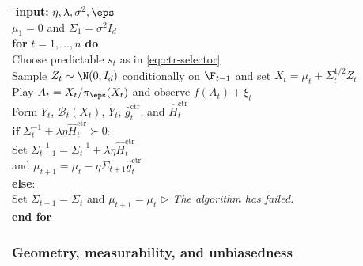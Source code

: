\begin{algorithm}[!t]
    \caption{Tangent-centred unprojected Hermite--ONS}
    \label{alg:ctr-unprojected}
    \small
    \begin{tabbing}
        \qquad\=\qquad\=\kill
        \textbf{input:} $\eta,\lambda,\sigma^2,\eps$\\
        $\mu_1=0$ and $\Sigma_1=\sigma^2I_d$\\[1mm]
        \textbf{for} $t=1,\ldots,n$ \textbf{do}\\
        \>Choose predictable $s_t$ as in \eqref{eq:ctr-selector}\\
        \>Sample $Z_t\sim\N(0,I_d)$ conditionally on $\F_{t-1}$ and set
        $X_t=\mu_t+\Sigma_t^{1/2}Z_t$\\
        \>Play $A_t=X_t/\pi_\eps(X_t)$ and observe $f(A_t)+\xi_t$\\
        \>Form $Y_t$, $\mathcal B_t(X_t)$, $\widetilde Y_t$,
        $\widehat g_t^{\mathrm{ctr}}$, and $\widehat H_t^{\mathrm{ctr}}$\\
        \>\textbf{if}
        $\Sigma_t^{-1}+\lambda\eta\widehat H_t^{\mathrm{ctr}}\succ0$:\\
        \>\>Set
        $\Sigma_{t+1}^{-1}
            =\Sigma_t^{-1}+\lambda\eta\widehat H_t^{\mathrm{ctr}}$\\
        \>\>and
        $\mu_{t+1}=\mu_t-\eta\Sigma_{t+1}
            \widehat g_t^{\mathrm{ctr}}$\\
        \>\textbf{else}:\\
        \>\>Set $\Sigma_{t+1}=\Sigma_t$ and $\mu_{t+1}=\mu_t$
        \qquad\textit{$\triangleright$ The algorithm has failed.}\\
        \textbf{end for}
    \end{tabbing}
\end{algorithm}

\subsubsection{Geometry, measurability, and unbiasedness}

